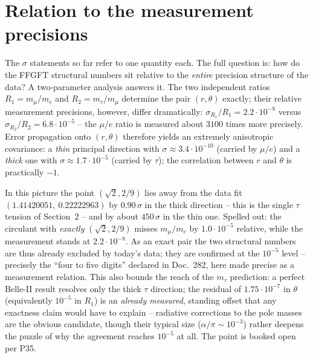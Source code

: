 \section{Relation to the measurement precisions}
\label{sec:precision}
The $\sigma$ statements so far refer to one quantity each. The full
question is: how do the FFGFT structural numbers sit relative to the
\emph{entire} precision structure of the data? A two-parameter analysis
answers it. The two independent ratios $R_1=m_\mu/m_e$ and
$R_2=m_\tau/m_\mu$ determine the pair $(r,\theta)$ exactly; their relative
measurement precisions, however, differ dramatically:
$\sigma_{R_1}/R_1 = 2.2\cdot10^{-8}$ versus
$\sigma_{R_2}/R_2 = 6.8\cdot10^{-5}$ -- the $\mu/e$ ratio is measured
about $3100$ times more precisely. Error propagation onto $(r,\theta)$
therefore yields an extremely anisotropic covariance: a \emph{thin}
principal direction with $\sigma \approx 3.4\cdot10^{-10}$ (carried by
$\mu/e$) and a \emph{thick} one with $\sigma \approx 1.7\cdot10^{-5}$
(carried by $\tau$); the correlation between $r$ and $\theta$ is
practically $-1$.

In this picture the point $(\sqrt2, 2/9)$ lies away from the data fit
$(1.41420051,\ 0.22222963)$ by $0.90\,\sigma$ in the thick direction --
this is the single $\tau$ tension of Section~2 -- and by about
$450\,\sigma$ in the thin one. Spelled out: the circulant with
\emph{exactly} $(\sqrt2, 2/9)$ misses $m_\mu/m_e$ by $1.0\cdot10^{-5}$
relative, while the measurement stands at $2.2\cdot10^{-8}$. As an exact
pair the two structural numbers are thus already excluded by today's data;
they are confirmed at the $10^{-5}$ level -- precisely the \enquote{four to
five digits} declared in Doc.~282, here made precise as a measurement
relation. This also bounds the reach of the $m_\tau$ prediction: a perfect
Belle-II result resolves only the thick $\tau$ direction; the residual of
$1.75\cdot10^{-7}$ in $\theta$ (equivalently $10^{-5}$ in $R_1$) is an
\emph{already measured}, standing offset that any exactness claim would
have to explain -- radiative corrections to the pole masses are the obvious
candidate, though their typical size ($\alpha/\pi \sim 10^{-3}$) rather
deepens the puzzle of why the agreement reaches $10^{-5}$ at all. The point
is booked open per P35.


